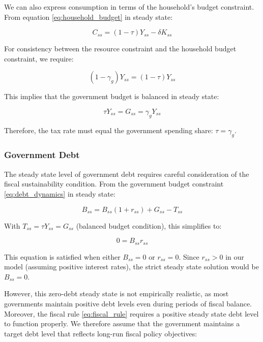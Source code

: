 \documentclass[5p,authoryear]{elsarticle}
\begin{document}
We can also express consumption in terms of the household's budget constraint. From equation \eqref{eq:household_budget} in steady state:

\begin{equation}
C_{ss} = (1-\tau) Y_{ss} - \delta K_{ss}
\label{eq:ss_consumption_household}
\end{equation}

For consistency between the resource constraint and the household budget constraint, we require:

\begin{equation}
(1 - \gamma_g) Y_{ss} = (1-\tau) Y_{ss}
\label{eq:consistency_condition}
\end{equation}

This implies that the government budget is balanced in steady state:

\begin{equation}
\tau Y_{ss} = G_{ss} = \gamma_g Y_{ss}
\label{eq:balanced_budget}
\end{equation}

Therefore, the tax rate must equal the government spending share: $\tau = \gamma_g$.

\subsubsection{Government Debt}

The steady state level of government debt requires careful consideration of the fiscal sustainability condition. From the government budget constraint \eqref{eq:debt_dynamics} in steady state:

\begin{equation}
B_{ss} = B_{ss} (1 + r_{ss}) + G_{ss} - T_{ss}
\label{eq:ss_government_budget}
\end{equation}

With $T_{ss} = \tau Y_{ss} = G_{ss}$ (balanced budget condition), this simplifies to:

\begin{equation}
0 = B_{ss} r_{ss}
\label{eq:ss_debt_condition}
\end{equation}

This equation is satisfied when either $B_{ss} = 0$ or $r_{ss} = 0$. Since $r_{ss} > 0$ in our model (assuming positive interest rates), the strict steady state solution would be $B_{ss} = 0$.

However, this zero-debt steady state is not empirically realistic, as most governments maintain positive debt levels even during periods of fiscal balance. Moreover, the fiscal rule \eqref{eq:fiscal_rule} requires a positive steady state debt level to function properly. We therefore assume that the government maintains a target debt level that reflects long-run fiscal policy objectives:
\end{document}
